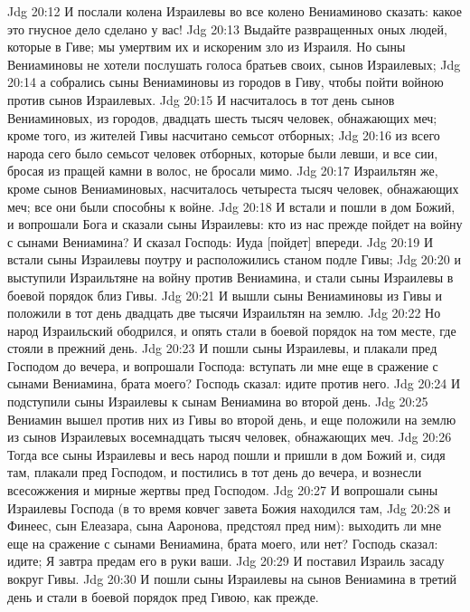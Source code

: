 \vs Jdg 20:12 И послали колена Израилевы во все колено Вениаминово сказать: какое это гнусное дело сделано у вас!
\vs Jdg 20:13 Выдайте развращенных оных людей, которые в Гиве; мы умертвим их и искореним зло из Израиля. Но сыны Вениаминовы не хотели послушать голоса братьев своих, сынов Израилевых;
\vs Jdg 20:14 а собрались сыны Вениаминовы из городов в Гиву, чтобы пойти войною против сынов Израилевых.
\vs Jdg 20:15 И насчиталось в тот день сынов Вениаминовых,  из городов, двадцать шесть тысяч человек, обнажающих меч; кроме того, из жителей Гивы насчитано семьсот отборных;
\vs Jdg 20:16 из всего народа сего было семьсот человек отборных, которые были левши, и все сии, бросая из пращей камни в волос, не бросали мимо.
\vs Jdg 20:17 Израильтян же, кроме сынов Вениаминовых, насчиталось четыреста тысяч человек, обнажающих меч; все они были способны к войне.
\vs Jdg 20:18 И встали и пошли в дом Божий, и вопрошали Бога и сказали сыны Израилевы: кто из нас прежде пойдет на войну с сынами Вениамина? И сказал Господь: Иуда [пойдет] впереди.
\vs Jdg 20:19 И встали сыны Израилевы поутру и расположились станом подле Гивы;
\vs Jdg 20:20 и выступили Израильтяне на войну против Вениамина, и стали сыны Израилевы в боевой порядок близ Гивы.
\vs Jdg 20:21 И вышли сыны Вениаминовы из Гивы и положили в тот день двадцать две тысячи Израильтян на землю.
\vs Jdg 20:22 Но народ Израильский ободрился, и опять стали в боевой порядок на том месте, где стояли в прежний день.
\vs Jdg 20:23 И пошли сыны Израилевы, и плакали пред Господом до вечера, и вопрошали Господа: вступать ли мне еще в сражение с сынами Вениамина, брата моего? Господь сказал: идите против него.
\vs Jdg 20:24 И подступили сыны Израилевы к сынам Вениамина во второй день.
\vs Jdg 20:25 Вениамин вышел против них из Гивы во второй день, и еще положили на землю из сынов Израилевых восемнадцать тысяч человек, обнажающих меч.
\rsbpar\vs Jdg 20:26 Тогда все сыны Израилевы и весь народ пошли и пришли в дом Божий и, сидя там, плакали пред Господом, и постились в тот день до вечера, и вознесли всесожжения и мирные жертвы пред Господом.
\vs Jdg 20:27 И вопрошали сыны Израилевы Господа (в то время ковчег завета Божия находился там,
\vs Jdg 20:28 и Финеес, сын Елеазара, сына Ааронова, предстоял пред ним): выходить ли мне еще на сражение с сынами Вениамина, брата моего, или нет? Господь сказал: идите; Я завтра предам его в руки ваши.
\rsbpar\vs Jdg 20:29 И поставил Израиль засаду вокруг Гивы.
\vs Jdg 20:30 И пошли сыны Израилевы на сынов Вениамина в третий день и стали в боевой порядок пред Гивою, как прежде.
